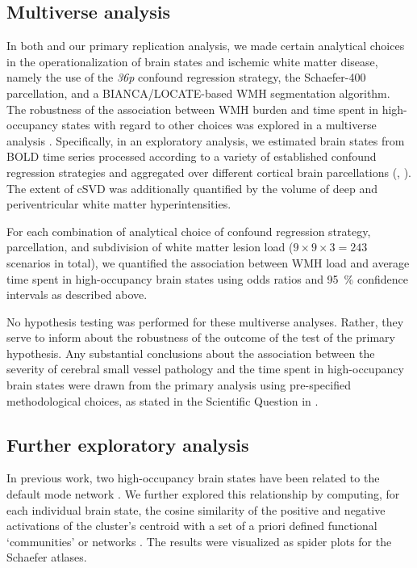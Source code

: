 \subsection{Multiverse analysis}
In both \citep{Schlemm2022-he} and our primary replication analysis, we made certain analytical choices in the operationalization of brain states and ischemic white matter disease, namely the use of the \textit{36p} confound regression strategy, the Schaefer-\num{400} parcellation, and a BIANCA/LOCATE-based WMH segmentation algorithm.
The robustness of the association between WMH burden and time spent in high-occupancy states with regard to other choices was explored in a multiverse analysis \citep{Steegen2016-ze}. Specifically, in an exploratory analysis, we estimated brain states from BOLD time series processed according to a variety of established confound regression strategies and aggregated over different cortical brain parcellations (, \cite{ciric2018mitigating,Ciric2017-cl}). The extent of cSVD was additionally quantified by the volume of deep and periventricular white matter hyperintensities.



For each combination of analytical choice of confound regression strategy, parcellation, and subdivision of white matter lesion load ($9\times9\times3=243$ scenarios in total), we quantified the association between WMH load and average time spent in high-occupancy brain states using odds ratios and \qty{95}{\percent} confidence intervals as described above.

No hypothesis testing was performed for these multiverse analyses. Rather, they serve to inform about the robustness of the outcome of the test of the primary hypothesis.
Any substantial conclusions about the association between the severity of cerebral small vessel pathology and the time spent in high-occupancy brain states were drawn from the primary analysis using pre-specified methodological choices, as stated in the Scientific Question in .

\subsection{Further exploratory analysis}
In previous work, two high-occupancy brain states have been related to the default mode network \citep{Cornblath2020-fu}.
We further explored this relationship by computing, for each individual brain state, the cosine similarity of the positive and negative activations of the cluster’s centroid with a set of a priori defined functional ‘communities’ or networks \citep{Schaefer2018-bo,Yeo2011-qg}.
The results were visualized as spider plots for the Schaefer atlases.

